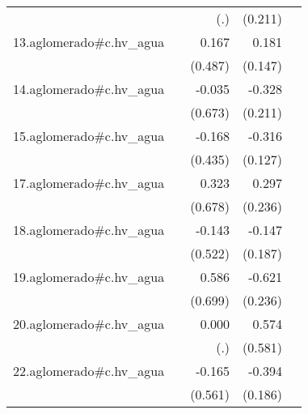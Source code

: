{\begin{longtable}{l*{4}{D{.}{.}{-1}}}
            &                     &         (.)         &     (0.211)         &                     \\
\addlinespace
13.aglomerado#c.hv\_agua&                     &       0.167         &       0.181         &                     \\
            &                     &     (0.487)         &     (0.147)         &                     \\
\addlinespace
14.aglomerado#c.hv\_agua&                     &      -0.035         &      -0.328         &                     \\
            &                     &     (0.673)         &     (0.211)         &                     \\
\addlinespace
15.aglomerado#c.hv\_agua&                     &      -0.168         &      -0.316\sym{*}  &                     \\
            &                     &     (0.435)         &     (0.127)         &                     \\
\addlinespace
17.aglomerado#c.hv\_agua&                     &       0.323         &       0.297         &                     \\
            &                     &     (0.678)         &     (0.236)         &                     \\
\addlinespace
18.aglomerado#c.hv\_agua&                     &      -0.143         &      -0.147         &                     \\
            &                     &     (0.522)         &     (0.187)         &                     \\
\addlinespace
19.aglomerado#c.hv\_agua&                     &       0.586         &      -0.621\sym{**} &                     \\
            &                     &     (0.699)         &     (0.236)         &                     \\
\addlinespace
20.aglomerado#c.hv\_agua&                     &       0.000         &       0.574         &                     \\
            &                     &         (.)         &     (0.581)         &                     \\
\addlinespace
22.aglomerado#c.hv\_agua&                     &      -0.165         &      -0.394\sym{*}  &                     \\
            &                     &     (0.561)         &     (0.186)         &                     \\

\end{longtable}}
